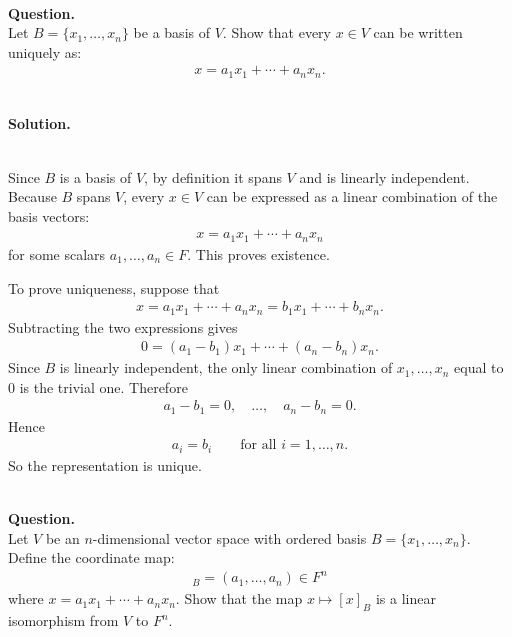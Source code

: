 \documentclass{article}
\begin{document}
\bigskip

\hfill \break  $~\!\!$ \dotfill \medskip \\
\textbf{Question.}\\
Let $B = \{x_1,\dots,x_n\}$ be a basis of $V$. Show that every $x \in V$ can be written uniquely as:
\begin{align*}
x = a_1 x_1 + \cdots + a_n x_n.
\end{align*}

\noindent\\
\textbf{Solution.}\\
\quad\\
\begin{mdframed}[linewidth=1pt]
Since $B$ is a basis of $V$, by definition it spans $V$ and is linearly independent. Because $B$ spans $V$, every $x\in V$ can be expressed as a linear combination of the basis vectors:
\begin{align*}
x=a_1x_1+\cdots+a_nx_n
\end{align*}
for some scalars $a_1,\dots,a_n\in F$. This proves existence.

To prove uniqueness, suppose that
\begin{align*}
x=a_1x_1+\cdots+a_nx_n=b_1x_1+\cdots+b_nx_n.
\end{align*}
Subtracting the two expressions gives
\begin{align*}
0=(a_1-b_1)x_1+\cdots+(a_n-b_n)x_n.
\end{align*}
Since $B$ is linearly independent, the only linear combination of $x_1,\dots,x_n$ equal to $0$ is the trivial one. Therefore
\begin{align*}
a_1-b_1=0,\quad \dots,\quad a_n-b_n=0.
\end{align*}
Hence
\begin{align*}
a_i=b_i\qquad \text{for all } i=1,\dots,n.
\end{align*}
So the representation is unique.
\end{mdframed}

\bigskip

\hfill \break  $~\!\!$ \dotfill \medskip \\
\textbf{Question.}\\
Let $V$ be an $n$-dimensional vector space with ordered basis $B = \{x_1,\dots,x_n\}$. Define the coordinate map:
\begin{align*}
[x]_B = (a_1,\dots,a_n) \in F^n
\end{align*}
where $x = a_1 x_1 + \cdots + a_n x_n$. Show that the map $x \mapsto [x]_B$ is a linear isomorphism from $V$ to $F^n$.
\end{document}
